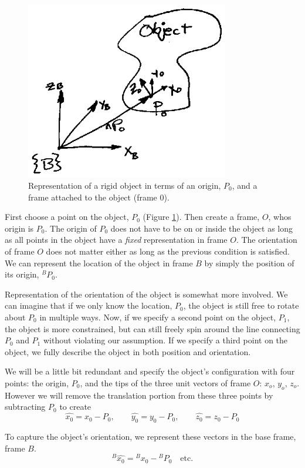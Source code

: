 \begin{figure}
\includegraphics[width=3.5in]{figs02/00322.eps}
\caption{Representation of a rigid object in terms of an origin, $P_0$, and a frame attached to the object (frame $0$).}\label{ObjectLocationOrientation}
\end{figure}

First choose a point on the object, $P_0$ (Figure \ref{ObjectLocationOrientation}).    Then create a frame, $O$, whos origin is $P_0$.   The origin of $P_0$ does not have to be on or inside the object as long as all points in the object have a {\it fixed} representation in frame $O$.   The orientation of frame $O$ does not matter either as long as the previous condition is satisfied.   We can represent the location of the object in frame $B$ by simply the position of its origin, $^BP_0$.

Representation of the orientation of the object is somewhat more involved.   We can imagine that if we only know the location, $P_0$, the object is still free to rotate about $P_0$ in multiple ways.  Now, if we specify a second point on the object, $P_1$, the object is more constrained, but can still freely spin around the line connecting $P_0$ and $P_1$ without violating our assumption.  If we specify a third point on the object, we fully describe the object in both position and orientation.

We will be a little bit redundant and specify the object's configuration with four points:  the origin, $P_0$, and the tips of the three unit vectors of frame $O$:  $x_o$, $y_o$, $z_o$.   However we will remove the translation portion from these three points by subtracting $P_0$ to create
\[
\hat{x_0} = x_0 -P_0, \qquad \hat{y_0} = y_0-P_0,\qquad \hat{z_0} = z_0-P_0
\]

To capture the object's orientation, we represent these vectors in the base frame, frame $B$.
\[
^B\hat{x_0} = {^Bx_0} - {^BP_0} \quad \mathrm{etc.}
\]

